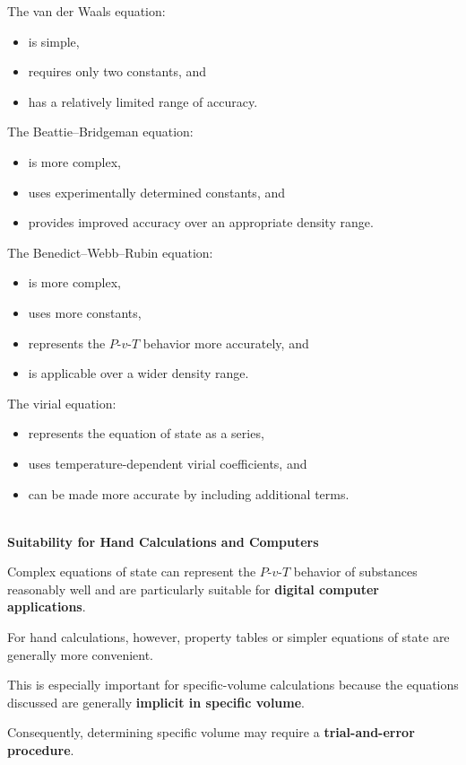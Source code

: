 \documentclass[12pt]{article}
\begin{document}
The van der Waals equation:
\begin{itemize}
    \item is simple,
    \item requires only two constants, and
    \item has a relatively limited range of accuracy.
\end{itemize}

The Beattie--Bridgeman equation:
\begin{itemize}
    \item is more complex,
    \item uses experimentally determined constants, and
    \item provides improved accuracy over an appropriate density range.
\end{itemize}

The Benedict--Webb--Rubin equation:
\begin{itemize}
    \item is more complex,
    \item uses more constants,
    \item represents the $P$-$v$-$T$ behavior more accurately, and
    \item is applicable over a wider density range.
\end{itemize}

The virial equation:
\begin{itemize}
    \item represents the equation of state as a series,
    \item uses temperature-dependent virial coefficients, and
    \item can be made more accurate by including additional terms.
\end{itemize}

\textbf{\\ Suitability for Hand Calculations and Computers}

Complex equations of state can represent the $P$-$v$-$T$ behavior of substances reasonably well and are particularly suitable for \textbf{digital computer applications}.

For hand calculations, however, property tables or simpler equations of state are generally more convenient.

This is especially important for specific-volume calculations because the equations discussed are generally \textbf{implicit in specific volume}.

Consequently, determining specific volume may require a \textbf{trial-and-error procedure}.
\end{document}
